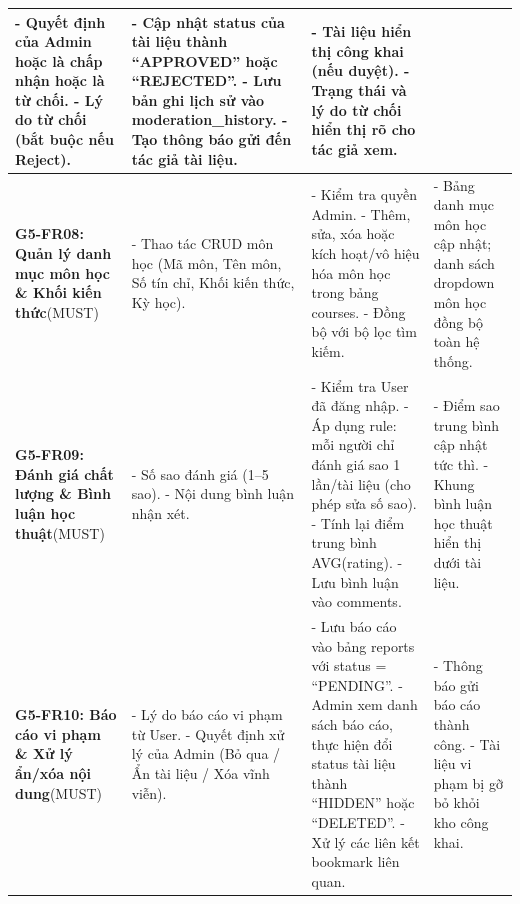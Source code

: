 \begin{table}[H]
\begin{tabularx}{\textwidth}{|p{3.6cm}|p{3.2cm}|X|p{3.2cm}|}
- Quyết định của Admin hoặc là chấp nhận hoặc là từ chối.\newline
- Lý do từ chối (bắt buộc nếu Reject). & 
- Cập nhật status của tài liệu thành ``APPROVED'' hoặc ``REJECTED''.\newline
- Lưu bản ghi lịch sử vào moderation\_history.\newline
- Tạo thông báo gửi đến tác giả tài liệu. & 
- Tài liệu hiển thị công khai (nếu duyệt).\newline
- Trạng thái và lý do từ chối hiển thị rõ cho tác giả xem. \\
\hline
\textbf{G5-FR08: Quản lý danh mục môn học \& Khối kiến thức}\newline(MUST) & 
- Thao tác CRUD môn học (Mã môn, Tên môn, Số tín chỉ, Khối kiến thức, Kỳ học). & 
- Kiểm tra quyền Admin.\newline
- Thêm, sửa, xóa hoặc kích hoạt/vô hiệu hóa môn học trong bảng courses.\newline
- Đồng bộ với bộ lọc tìm kiếm. & 
- Bảng danh mục môn học cập nhật; danh sách dropdown môn học đồng bộ toàn hệ thống. \\
\hline
\textbf{G5-FR09: Đánh giá chất lượng \& Bình luận học thuật}\newline(MUST) & 
- Số sao đánh giá (1--5 sao).\newline
- Nội dung bình luận nhận xét. & 
- Kiểm tra User đã đăng nhập.\newline
- Áp dụng rule: mỗi người chỉ đánh giá sao 1 lần/tài liệu (cho phép sửa số sao).\newline
- Tính lại điểm trung bình AVG(rating).\newline
- Lưu bình luận vào comments. & 
- Điểm sao trung bình cập nhật tức thì.\newline
- Khung bình luận học thuật hiển thị dưới tài liệu. \\
\hline
\textbf{G5-FR10: Báo cáo vi phạm \& Xử lý ẩn/xóa nội dung}\newline(MUST) & 
- Lý do báo cáo vi phạm từ User.\newline
- Quyết định xử lý của Admin (Bỏ qua / Ẩn tài liệu / Xóa vĩnh viễn). & 
- Lưu báo cáo vào bảng reports với status = ``PENDING''.\newline
- Admin xem danh sách báo cáo, thực hiện đổi status tài liệu thành ``HIDDEN'' hoặc ``DELETED''.\newline
- Xử lý các liên kết bookmark liên quan. & 
- Thông báo gửi báo cáo thành công.\newline
- Tài liệu vi phạm bị gỡ bỏ khỏi kho công khai. \\

\end{tabularx}
\end{table}
